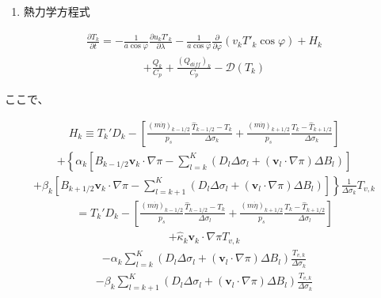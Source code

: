 \begin{enumerate}
\def\labelenumi{\arabic{enumi}.}
\setcounter{enumi}{3}
\tightlist
\item
  熱力学方程式
\end{enumerate}

\begin{eqnarray}
  \frac{\partial T_k}{\partial t}
     =  - \frac{1}{a\cos\varphi}
               \frac{\partial u_k T'_k}{\partial \lambda}
          - \frac{1}{a\cos\varphi}
               \frac{\partial }{\partial \varphi} (v_k T'_k \cos\varphi)
          + H_k
\end{eqnarray} \begin{eqnarray}
        + \frac{Q_k}{C_{p}}
          + \frac{(Q_{diff})_k}{C_p} 
          - {\mathcal D}(T_k)
\end{eqnarray}

ここで、

\begin{eqnarray}
   H_k 
     \equiv  T_k' D_k
              - \left[   \frac{(m\dot{\eta})_{k-1/2}}{p_s} \frac{\hat{T}_{k-1/2} - T_k}{\Delta\sigma_k}
               + \frac{(m\dot{\eta})_{k+1/2}}{p_s} \frac{T_k - \hat{T}_{k+1/2}}{\Delta\sigma_k} \right]
\end{eqnarray} \begin{eqnarray}
        + \left\{ \alpha_k
                    \left[ B_{k-1/2} {\mathbf{v}}_k \cdot \nabla \pi
                          - \sum_{l=k}^{K} 
                           (D_l \Delta \sigma_l + ({\mathbf{v}}_l \cdot \nabla \pi)\Delta B_l)
                    \right]
             \right.
\end{eqnarray} \begin{eqnarray}
          + \left. \beta_k
                     \left[ B_{k+1/2} {\mathbf{v}}_k \cdot \nabla \pi
                          - \sum_{l=k+1}^{K} 
                           (D_l \Delta \sigma_l + ({\mathbf{v}}_l \cdot \nabla \pi)\Delta B_l)
                    \right]
              \right\} 
              \frac{1}{\Delta \sigma_k} T_{v,k}
\end{eqnarray} \begin{eqnarray}
     =  T_k' D_k 
          - \left[ \frac{(m\dot{\eta})_{k-1/2}}{p_s} \frac{\hat{T}_{k-1/2} - T_k}{\Delta \sigma_l}
               + \frac{(m\dot{\eta})_{k+1/2}}{p_s} \frac{T_k - \hat{T}_{k+1/2}}{\Delta \sigma_l} \right]
\end{eqnarray} \begin{eqnarray}
        + \hat{\kappa}_k {\mathbf{v}}_k \cdot \nabla \pi T_{v,k} 
\end{eqnarray} \begin{eqnarray}
        - \alpha_k \sum_{l=k}^{K} 
                           (D_l \Delta \sigma_l + ({\mathbf{v}}_l \cdot \nabla \pi)\Delta B_l)
                            \frac{T_{v,k}}{\Delta \sigma_k} 
\end{eqnarray} \begin{eqnarray}
        - \beta_k \sum_{l=k+1}^{K} 
                           (D_l \Delta \sigma_l + ({\mathbf{v}}_l \cdot \nabla \pi)\Delta B_l)
                            \frac{T_{v,k}}{\Delta \sigma_k}
\end{eqnarray}

